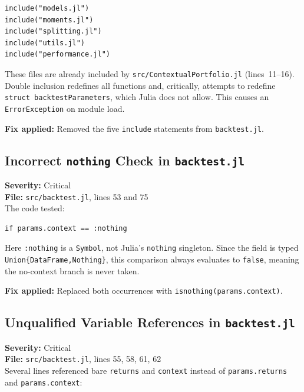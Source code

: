 \documentclass[11pt,a4paper]{article}
\begin{document}
\begin{lstlisting}
include("models.jl")
include("moments.jl")
include("splitting.jl")
include("utils.jl")
include("performance.jl")
\end{lstlisting}

These files are already included by \texttt{src/ContextualPortfolio.jl}
(lines~11--16). Double inclusion redefines all functions and, critically, attempts
to redefine \texttt{struct backtestParameters}, which Julia does not allow.
This causes an \texttt{ErrorException} on module load.

\textbf{Fix applied:} Removed the five \texttt{include} statements from
\texttt{backtest.jl}.

\subsection{Incorrect \texttt{nothing} Check in \texttt{backtest.jl}}
\label{sec:nothing-check}

\textbf{Severity:} Critical\\
\textbf{File:} \texttt{src/backtest.jl}, lines 53 and 75\\[0.3em]
The code tested:

\begin{lstlisting}
if params.context == :nothing
\end{lstlisting}

Here \texttt{:nothing} is a \texttt{Symbol}, not Julia's \texttt{nothing} singleton.
Since the field is typed \texttt{Union\{DataFrame,Nothing\}}, this comparison
always evaluates to \texttt{false}, meaning the no-context branch is never taken.

\textbf{Fix applied:} Replaced both occurrences with \texttt{isnothing(params.context)}.

\subsection{Unqualified Variable References in \texttt{backtest.jl}}
\label{sec:unqualified}

\textbf{Severity:} Critical\\
\textbf{File:} \texttt{src/backtest.jl}, lines 55, 58, 61, 62\\[0.3em]
Several lines referenced bare \texttt{returns} and \texttt{context} instead of
\texttt{params.returns} and \texttt{params.context}:
\end{document}
